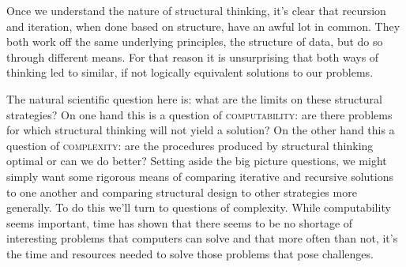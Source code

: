\documentclass[]{tufte-handout}
\begin{document}
Once we understand the nature of structural thinking, it's clear that recursion and iteration, when done based on structure, have an awful lot in common. They both work off the same underlying principles, the structure of data, but do so through different means. For that reason it is unsurprising that both ways of thinking led to similar, if not logically equivalent solutions to our problems. 

The natural scientific question here is: what are the limits on these structural strategies?  On one hand this is a question of \textsc{computability}: are there problems for which structural thinking will not yield a solution?  On the other hand this a question of \textsc{complexity}: are the procedures produced by structural thinking optimal or can we do better? Setting aside the big picture questions, we might simply want some rigorous means of comparing iterative and recursive solutions to one another and comparing structural design to other strategies more generally. To do this we'll turn to questions of complexity. While computability seems important, time has shown that there seems to be no shortage of interesting problems that computers can solve and that more often than not, it's the time and resources needed to solve those problems that pose challenges.
\end{document}

